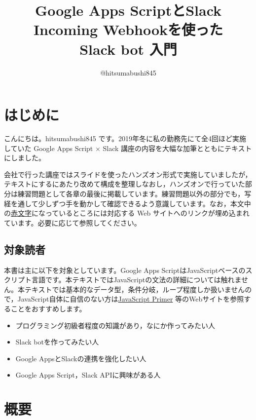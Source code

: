 \documentclass[uplatex,a4j]{jsarticle}
\title{Google Apps ScriptとSlack Incoming Webhookを使った\\Slack bot 入門}
\author{@hitsumabushi845}
\date{}
\begin{document}
\VerbatimFootnotes

\maketitle
\tableofcontents

\clearpage

\section{はじめに}

こんにちは。hitsumabushi845 です。2019年冬に私の勤務先にて全4回ほど実施していた Google Apps Script $\times$ Slack 講座の内容を大幅な加筆とともにテキストにしました。


会社で行った講座ではスライドを使ったハンズオン形式で実施していましたが，テキストにするにあたり改めて構成を整理しなおし，ハンズオンで行っていた部分は練習問題として各章の最後に掲載しています。練習問題以外の部分でも，写経を通して少しずつ手を動かして確認できるよう意識しています。なお，本文中の\href{http://google.co.jp}{赤文字}になっているところには対応する Web サイトへのリンクが埋め込まれています。必要に応じて参照してください。

\subsection{対象読者}

本書は主に以下を対象としています。Google Apps ScriptはJavaScriptベースのスクリプト言語です。本テキストではJavaScriptの文法の詳細については触れません。本テキストでは基本的なデータ型，条件分岐，ループ程度しか扱いませんので，JavaScript自体に自信のない方は\href{https://jsprimer.net/}{JavaScript Primer} 等のWebサイトを参照することをおすすめします。

\begin{itemize}
\item プログラミング初級者程度の知識があり，なにか作ってみたい人
\item Slack botを作ってみたい人
\item Google AppsとSlackの連携を強化したい人
\item Google Apps Script，Slack APIに興味がある人
\end{itemize}

\clearpage

\section{概要}
\end{document}
